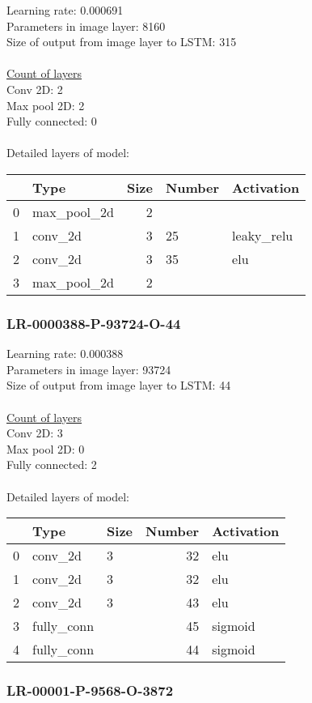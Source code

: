Learning rate: 0.000691
\\Parameters in image layer: 8160
\\Size of output from image layer to LSTM: 315
\\\\\underline{Count of layers} 
\\Conv 2D:           2\\Max pool 2D:      2\\Fully connected:  0
\\\\Detailed layers of model: \\\begin{tabular}{rlrll}
\hline
    & Type        &   Size & Number   & Activation   \\
\hline
  0 & max\_pool\_2d &      2 &          &              \\
  1 & conv\_2d     &      3 & 25       & leaky\_relu   \\
  2 & conv\_2d     &      3 & 35       & elu          \\
  3 & max\_pool\_2d &      2 &          &              \\
\hline
\end{tabular}\subsubsection*{LR-0000388-P-93724-O-44}
Learning rate: 0.000388
\\Parameters in image layer: 93724
\\Size of output from image layer to LSTM: 44
\\\\\underline{Count of layers} 
\\Conv 2D:           3\\Max pool 2D:      0\\Fully connected:  2
\\\\Detailed layers of model: \\\begin{tabular}{rllrl}
\hline
    & Type       & Size   &   Number & Activation   \\
\hline
  0 & conv\_2d    & 3      &       32 & elu          \\
  1 & conv\_2d    & 3      &       32 & elu          \\
  2 & conv\_2d    & 3      &       43 & elu          \\
  3 & fully\_conn &        &       45 & sigmoid      \\
  4 & fully\_conn &        &       44 & sigmoid      \\
\hline
\end{tabular}\subsubsection*{LR-00001-P-9568-O-3872}
